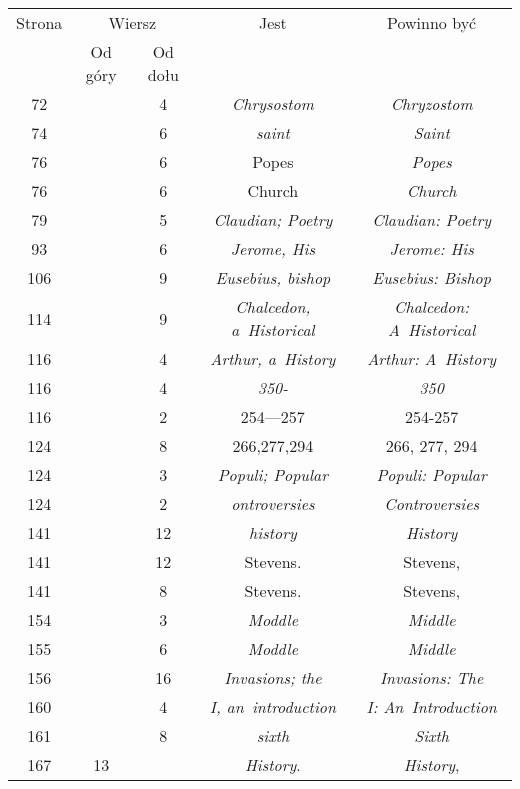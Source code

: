 \documentclass[a4paper,11pt]{article}
\begin{document}
\begin{center}
  \newpage

  \begin{tabular}{|c|c|c|c|c|}
    \hline
    Strona & \multicolumn{2}{c|}{Wiersz} & Jest
                              & Powinno być \\ \cline{2-3}
    & Od góry & Od dołu & & \\
    \hline
    72  & &  4 & \textit{Chrysostom} & \textit{Chryzostom} \\
    74  & &  6 & \textit{saint} & \textit{Saint} \\
    76  & &  6 & Popes & \textit{Popes} \\
    76  & &  6 & Church & \textit{Church} \\
    79  & &  5 & \textit{Claudian; Poetry} & \textit{Claudian: Poetry} \\
    93  & &  6 & \textit{Jerome, His} & \textit{Jerome: His} \\
    106 & &  9 & \textit{Eusebius, bishop} & \textit{Eusebius: Bishop} \\
    114 & &  9 & \textit{Chalcedon, a~Historical}
           & \textit{Chalcedon: A~Historical} \\
    116 & &  4 & \textit{Arthur, a~History} & \textit{Arthur: A~History} \\
    116 & &  4 & \textit{350-} & \textit{350} \\
    116 & &  2 & 254---257 & 254-257 \\
    124 & &  8 & 266,277,294 & 266, 277, 294 \\
    124 & &  3 & \textit{Populi; Popular} & \textit{Populi: Popular} \\
    124 & &  2 & \textit{ontroversies} & \textit{Controversies} \\
    141 & & 12 & \textit{history} & \textit{History} \\
    141 & & 12 & Stevens. & Stevens, \\
    141 & &  8 & Stevens. & Stevens, \\
    154 & &  3 & \textit{Moddle} & \textit{Middle} \\
    155 & &  6 & \textit{Moddle} & \textit{Middle} \\
    156 & & 16 & \textit{Invasions; the} & \textit{Invasions: The} \\
    160 & &  4 & \textit{I, an~introduction}
           & \textit{I: An~Introduction} \\
    161 & &  8 & \textit{sixth} & \textit{Sixth} \\
    167 & 13 & & \textit{History}. & \textit{History}, \\

\end{tabular}
\end{center}
\end{document}
